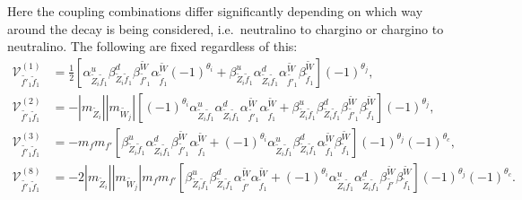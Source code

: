 \documentclass[final,3p,times,pdflatex]{elsarticle}
\begin{document}
Here the coupling combinations differ significantly depending on which way around the decay is being considered, i.e.\ neutralino to chargino or chargino to neutralino. The following are fixed regardless of this:
\begin{align}
\mathcal{V}_{\tilde{f'}_1 \tilde{f}_1}^{(1)} &= \frac{1}{2}\left[\alpha_{\tilde{Z}_i \tilde{f}_1}^{u} \beta_{\tilde{Z}_i \tilde{f}_1}^{d} \beta_{\tilde{f'}_1}^{\tilde{W}}\alpha_{\tilde{f}_1}^{\tilde{W}}(-1)^{\theta_i} + \beta_{\tilde{Z}_i \tilde{f}_1}^{u} \alpha_{\tilde{Z}_i \tilde{f}_1}^{d} \alpha_{\tilde{f'}_1}^{\tilde{W}} \beta_{\tilde{f}_1}^{\tilde{W}}\right](-1)^{\theta_j}, \\
\mathcal{V}_{\tilde{f'}_1 \tilde{f}_1}^{(2)} &= -|m_{\tilde{Z}_i}||m_{\tilde{W}_j}|\left[(-1)^{\theta_i} \alpha_{\tilde{Z}_i \tilde{f}_1}^{u} \alpha_{\tilde{Z}_i \tilde{f}_1}^{d} \alpha_{\tilde{f'}_1}^{\tilde{W}} \alpha_{\tilde{f}_1}^{\tilde{W}} + \beta_{\tilde{Z}_i \tilde{f}_1}^{u} \beta_{\tilde{Z}_{i} \tilde{f}_1}^{d} \beta_{\tilde{f'}_1}^{\tilde{W}} \beta_{\tilde{f}_1}^{\tilde{W}}\right](-1)^{\theta_j}, \\
\mathcal{V}_{\tilde{f'}_1 \tilde{f}_1}^{(3)} &= -m_{f}m_{f'}\left[\beta_{\tilde{Z}_i \tilde{f}_1}^{u} \alpha_{\tilde{Z}_i \tilde{f}_1}^{d} \beta_{\tilde{f'}_1}^{\tilde{W}} \alpha_{\tilde{f}_1}^{\tilde{W}} + (-1)^{\theta_i} \alpha_{\tilde{Z}_i \tilde{f}_1}^{u} \beta_{\tilde{Z}_i \tilde{f}_1}^{d} \alpha_{\tilde{f}_1}^{\tilde{W}} \beta_{\tilde{f}_1}^{\tilde{W}}\right](-1)^{\theta_j}(-1)^{\theta_c}  , \\
\mathcal{V}_{\tilde{f'}_1 \tilde{f}_1}^{(8)} &= -2|m_{\tilde{Z}_i}||m_{\tilde{W}_j}|m_{f} m_{f'} \left[\beta_{\tilde{Z}_i \tilde{f}_1}^{u}\beta_{\tilde{Z}_i \tilde{f}_1}^{d} \alpha_{\tilde{f'}}^{\tilde{W}} \alpha_{\tilde{f}_1}^{\tilde{W}} + (-1)^{\theta_i}\alpha_{\tilde{Z}_i \tilde{f}_1}^{u} \alpha_{\tilde{Z}_i \tilde{f}_1}^{d} \beta_{\tilde{f'}}^{\tilde{W}} \beta_{\tilde{f}_1}^{\tilde{W}}\right] (-1)^{\theta_j}(-1)^{\theta_c}.
\end{align}
\end{document}
